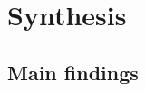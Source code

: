 	
\chapter{Synthesis}
\label{chap:synth}
\newpage



\section{Main findings}
\label{sec:synth:mainfind}

%

%
%   
%
%
%
%
%
%

%


